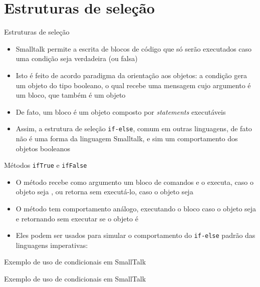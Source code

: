 \section{Estruturas de seleção}

\begin{frame}[fragile]{Estruturas de seleção}

    \begin{itemize}
        \item Smalltalk permite a escrita de blocos de código que só serão executados caso uma
            condição seja verdadeira (ou falsa)

        \item Isto é feito de acordo paradigma da orientação aos objetos: a condição gera um
            objeto do tipo booleano, o qual recebe uma mensagem cujo argumento é um bloco, que
            também é um objeto

        \item De fato, um bloco é um objeto composto por \textit{statements} executáveis

        \item Assim, a estrutura de seleção  \texttt{if-else}, comum em outras linguagens, de 
            fato não é uma forma da linguagem Smalltalk, e sim um comportamento dos objetos
            booleanos

    \end{itemize}

\end{frame}

\begin{frame}[fragile]{Métodos \texttt{ifTrue} e \texttt{ifFalse}}

    \begin{itemize}
        \item O método  recebe como argumento um bloco de comandos e o
            executa, caso o objeto seja , ou retorna sem executá-lo, caso
            o objeto seja 


        \item O método  tem comportamento análogo, executando o bloco
            caso o objeto seja  e retornando sem executar se o objeto é


        \item Eles podem ser usados para simular o comportamento do \texttt{if-else} padrão das
            linguagens imperativas:

    \end{itemize}

\end{frame}

\begin{frame}[fragile]{Exemplo de uso de condicionais em SmallTalk}
\end{frame}

\begin{frame}[fragile]{Exemplo de uso de condicionais em SmallTalk}
\end{frame}
